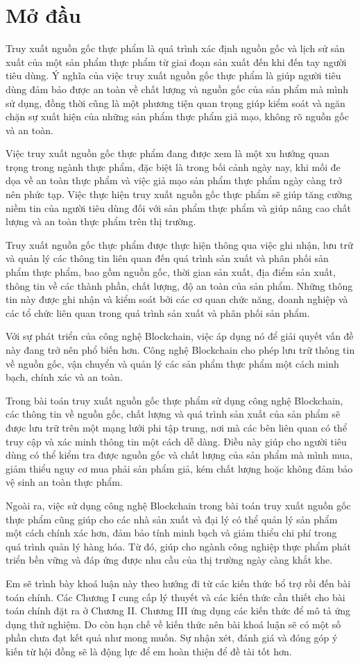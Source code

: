\section*{Mở đầu}
\setcounter{page}{1}
Truy xuất nguồn gốc thực phẩm là quá trình xác định nguồn gốc và lịch sử sản xuất của một sản phẩm
thực phẩm từ giai đoạn sản xuất đến khi đến tay người tiêu dùng. Ý nghĩa của việc truy xuất nguồn 
gốc thực phẩm là giúp người tiêu dùng đảm bảo được an toàn về chất lượng và nguồn gốc của sản phẩm
mà mình sử dụng, đồng thời cũng là một phương tiện quan trọng giúp kiểm soát và ngăn chặn sự xuất
hiện của những sản phẩm thực phẩm giả mạo, không rõ nguồn gốc và an toàn.

Việc truy xuất nguồn gốc thực phẩm đang được xem là một xu hướng quan trọng trong ngành thực phẩm,
đặc biệt là trong bối cảnh ngày nay, khi mối đe dọa về an toàn thực phẩm và việc giả mạo sản phẩm 
thực phẩm ngày càng trở nên phức tạp. Việc thực hiện truy xuất nguồn gốc thực phẩm sẽ giúp tăng
cường niềm tin của người tiêu dùng đối với sản phẩm thực phẩm và giúp nâng cao chất lượng và an toàn thực phẩm trên thị trường.

Truy xuất nguồn gốc thực phẩm được thực hiện thông qua việc ghi nhận, lưu trữ và quản lý các thông
tin liên quan đến quá trình sản xuất và phân phối sản phẩm thực phẩm, bao gồm nguồn gốc, thời gian
sản xuất, địa điểm sản xuất, thông tin về các thành phần, chất lượng, độ an toàn của sản phẩm. 
Những thông tin này được ghi nhận và kiểm soát bởi các cơ quan chức năng, doanh nghiệp và các tổ 
chức liên quan trong quá trình sản xuất và phân phối sản phẩm.

Với sự phát triển của công nghệ Blockchain, việc áp dụng nó để giải quyết vấn đề này đang trở nên 
phổ biến hơn. Công nghệ Blockchain cho phép lưu trữ thông tin về nguồn gốc, vận chuyển và quản lý 
các sản phẩm thực phẩm một cách minh bạch, chính xác và an toàn.

Trong bài toán truy xuất nguồn gốc thực phẩm sử dụng công nghệ Blockchain, các thông tin về nguồn 
gốc, chất lượng và quá trình sản xuất của sản phẩm sẽ được lưu trữ trên một mạng lưới phi tập trung,
nơi mà các bên liên quan có thể truy cập và xác minh thông tin một cách dễ dàng. Điều này giúp cho 
người tiêu dùng có thể kiểm tra được nguồn gốc và chất lượng của sản phẩm mà mình mua, giảm thiểu 
nguy cơ mua phải sản phẩm giả, kém chất lượng hoặc không đảm bảo vệ sinh an toàn thực phẩm.

Ngoài ra, việc sử dụng công nghệ Blockchain trong bài toán truy xuất nguồn gốc thực phẩm cũng giúp
cho các nhà sản xuất và đại lý có thể quản lý sản phẩm một cách chính xác hơn, đảm bảo tính minh 
bạch và giảm thiểu chi phí trong quá trình quản lý hàng hóa. Từ đó, giúp cho ngành công nghiệp thực
phẩm phát triển bền vững và đáp ứng được nhu cầu của thị trường ngày càng khắt khe.

Em sẽ trình bày khoá luận này theo hướng đi từ các kiến thức bổ trợ rồi đến bài toán chính.
Các Chương I cung cấp lý thuyết và các kiến thức cần thiết cho bài toán chính đặt ra ở Chương II.
Chương III ứng dụng các kiến thức để mô tả ứng dụng thử nghiệm.
Do còn hạn chế về kiến thức nên bài khoá luận sẽ có một số phần chưa đạt kết quả như mong muốn. 
Sự nhận xét, đánh giá và đóng góp ý kiến từ hội đồng sẽ là động lực để em hoàn thiện để
đề tài tốt hơn.
